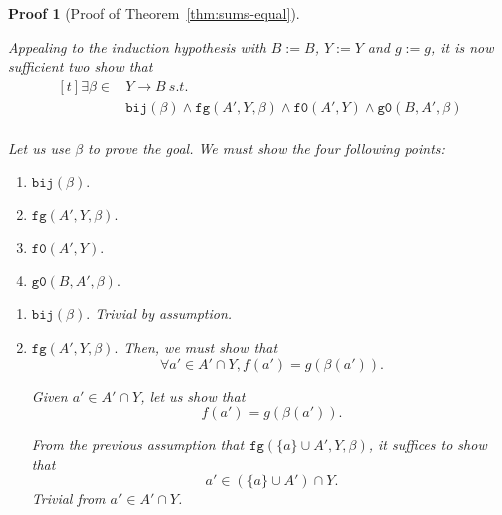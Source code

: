\documentclass[pdflatex,sn-mathphys]{sn-jnl}%
\theoremstyle{thmstyleone}%
\theoremstyle{thmstyletwo}%
\newtheorem*{pf}{Proof}%
\theoremstyle{thmstylethree}%
\begin{document}
\begin{pf}[Proof of Theorem~\ref{thm:sums-equal}]
\begin{enumerate}
\begin{enumerate}
          Appealing to the induction hypothesis with $B:=B$, $Y:=Y$
          and $g:=g$, it is now sufficient two show that
          \begin{equation*}
            \boxed{
              \begin{aligned}[t]
                \exists{}\beta\in{}&Y\rightarrow{}B~s.t.~\\
                                   & \mathtt{bij}(\beta)\land\mathtt{fg}(A',Y,\beta)\land\mathtt{f0}(A',Y)\land\mathtt{g0}(B,A',\beta) \\
              \end{aligned}
            }
          \end{equation*}

          Let us use $\beta$ to prove the goal. We must show the four following points:
          \begin{enumerate}
          \item $\boxed{\mathtt{bij}(\beta).}$
          \item $\boxed{\mathtt{fg}(A',Y,\beta).}$
          \item $\boxed{\mathtt{f0}(A',Y).}$
          \item $\boxed{\mathtt{g0}(B,A',\beta).}$
          \end{enumerate}

          \vspace{10pt}

          \begin{enumerate}
          \item $\boxed{\mathtt{bij}(\beta).}$ Trivial by assumption.
          \item $\boxed{\mathtt{fg}(A',Y,\beta).}$ Then, we must show that
            \begin{equation*}
              \boxed{\forall{}a'\in{}A'\cap{}Y,f(a')=g(\beta(a')).}
            \end{equation*}

            Given $a'\in{}A'\cap{}Y$, let us show that
            \begin{equation*}
              \boxed{f(a')=g(\beta(a')).}
            \end{equation*}

            From the previous assumption that
            $\mathtt{fg}(\{a\}\cup{}A',Y,\beta)$, it suffices to show
            that
            \begin{equation*}
              \boxed{a'\in(\{a\}\cup{}A')\cap{}Y.}
            \end{equation*}
            Trivial from $a'\in{}A'\cap{}Y$.
            

\end{enumerate}
\end{enumerate}
\end{enumerate}
\end{pf}
\end{document}
